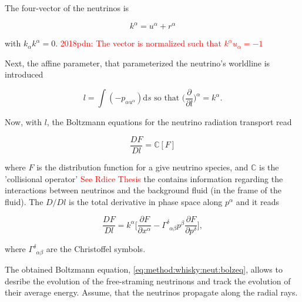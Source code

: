 \documentclass[11pt,a4paper,headinclude=true,DIV=14,BCOR=8mm,chapterprefix,listof=totoc,twoside,openright,abstracton]{scrbook}
\newcommand{\red}[1]{\textcolor{red}{#1}}
\newcommand{\dd}{\text{d}}
\begin{document}
The four-vector of the neutrinos is

\begin{equation}
    \label{eq:method:whisky:neut:k}
    k^{\alpha} = u^{\alpha} + r^{\alpha}
\end{equation}

with $k_{\alpha}k^{\alpha} = 0$.
\red{2018pdn: The vector is normalized such that $k^{\alpha}u_{\alpha}=-1$}

Next, the affine parameter, that parameterized the neutrino's worldline is introduced

\begin{equation}
    l = \int (-p_{\alpha u^{\alpha}})\dd s \text{ so that } \Big( \frac{\partial}{\partial l} \Big)^{\alpha} = k^{\alpha}.
\end{equation}

Now, with $l$, the Boltzmann equations for the neutrino radiation transport read \cite{Thorne:1981}

\begin{equation}
    \frac{D F}{D l} = \mathbb{C}[F]
\end{equation}

where $F$ is the distribution function for a give neutrino species, and $\mathbb{C}$ is the
'collisional operator' \red{See Rdice Thesis} the contains information regarding the interactions between neutrinos and the background fluid (in the frame of the fluid). 
The $D/Dl$ is the total derivative in phase space along $p^{\alpha}$ and it reads 

\begin{equation}
    \label{eq:method:whisky:neut:bolzeq}
    \frac{DF}{Dl} = k^{\alpha} \Big[ \frac{\partial F}{\partial x^{\alpha}} - \Gamma^{\delta}_{\:\:\alpha\beta}p^{\beta}\frac{\partial F}{\partial p^{\delta}} \Big],
\end{equation}

where $\Gamma^{\delta}_{\:\:\alpha\beta}$ are the Christoffel symbols.




The obtained Boltzmann equation, \eqref{eq:method:whisky:neut:bolzeq}, allows to desribe the evolution of the free-straming neutrinons and track the evolution of their average energy.
Assume, that the neutrinos propagate along the radial rays. 
\end{document}
